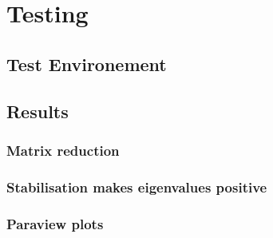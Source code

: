 \chapter{Testing}


\section{Test Environement}


\section{Results}

\subsection{Matrix reduction}

\subsection{Stabilisation makes eigenvalues positive}

\subsection{Paraview plots}